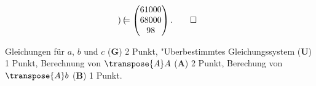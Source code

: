 \begin{loesung}
\begin{align*}
\begin{pmatrix}
\end{pmatrix}=\begin{pmatrix}61000\\68000\\98\end{pmatrix}.
\qedhere
\end{align*}
\end{loesung}

\begin{bewertung}
Gleichungen für $a$, $b$ und $c$ ({\bf G}) 2 Punkt,
"Uberbestimmtes Gleichungssystem ({\bf U}) 1 Punkt,
Berechnung von $\transpose{A}A$ ({\bf A}) 2 Punkt,
Berechung von $\transpose{A}b$ ({\bf B}) 1 Punkt.
\end{bewertung}

